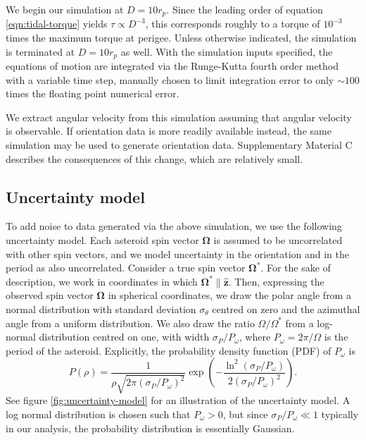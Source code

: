 \documentclass[fleqn,usenatbib]{mnras}
\newcommand{\unit}[1]{\bm{\hat{#1}}}
\newcommand{\parens}[1]{\left( #1 \right)}
\begin{document}
We begin our simulation at $D = 10 r_p$. Since the leading order of equation \ref{eqn:tidal-torque} yields $\tau \propto D^{-3}$, this corresponds roughly to a torque of $10^{-3}$ times the maximum torque at perigee. Unless otherwise indicated, the simulation is terminated at $D=10 r_p$ as well. With the simulation inputs specified, the equations of motion are integrated via the Runge-Kutta fourth order method with a variable time step, manually chosen to limit integration error to only $\sim 100$ times the floating point numerical error.

We extract angular velocity from this simulation assuming that angular velocity is observable. If orientation data is more readily available instead, the same simulation may be used to generate orientation data. Supplementary Material C describes the consequences of this change, which are relatively small.



\subsection{Uncertainty model}
\label{sec:uncertainty}

To add noise to data generated via the above simulation, we use the following uncertainty model. Each asteroid spin vector $\bm \Omega$ is assumed to be uncorrelated with other spin vectors, and we model uncertainty in the orientation and in the period as also uncorrelated. Consider a true spin vector $\bm \Omega^*$. For the sake of description, we work in coordinates in which $\bm \Omega^* \parallel \unit z$. Then, expressing the observed spin vector $\bm \Omega$ in spherical coordinates, we draw the polar angle from a normal distribution with standard deviation $\sigma_\theta$ centred on zero and the azimuthal angle from a uniform distribution. We also draw the ratio $\Omega/\Omega^*$ from a log-normal distribution centred on one, with width $\sigma_P / P_\omega$, where $P_\omega = 2\pi / \Omega$ is the period of the asteroid. Explicitly, the probability density function (PDF) of $P_\omega$ is 
\begin{equation}
  P(\rho) = \frac{1}{\rho\sqrt{2\pi (\sigma_P / P_\omega)^2}} \exp\parens{-\frac{\ln^2(\sigma_P / P_\omega)}{2(\sigma_P / P_\omega)^2}}.
\end{equation}
See figure \ref{fig:uncertainty-model} for an illustration of the uncertainty model. A log normal distribution is chosen such that $P_\omega > 0$, but since $\sigma_P/P_\omega \ll 1$ typically in our analysis, the probability distribution is essentially Gaussian.
\end{document}
